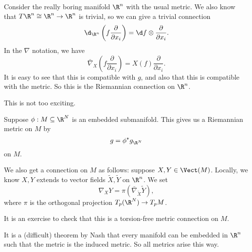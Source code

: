 \documentclass[a4paper]{article}
\begin{document}
\begin{eg}
  Consider the really boring manifold $\R^n$ with the usual metric. We also know that $T\R^n \cong \R^n \to \R^n$ is trivial, so we can give a trivial connection
  \[
    \d_{\R^n} \left(f \frac{\partial}{\partial x_i}\right) = \d f \otimes \frac{\partial}{\partial x_i}.
  \]
  In the $\nabla$ notation, we have
  \[
    \bar\nabla_X \left(f \frac{\partial}{\partial x_i}\right) = X(f) \frac{\partial}{\partial x_i}.
  \]
  It is easy to see that this is compatible with $g$, and also that this is compatible with the metric. So this is the Riemannian connection on $\R^n$.
\end{eg}

This is not too exciting.
\begin{eg}
  Suppose $\phi: M \subseteq \R^N$ is an embedded submanifold. This gives us a Riemannian metric on $M$ by
  \[
    g = \phi^* g_{\R^N}
  \]
  on $M$.

  We also get a connection on $M$ as follows: suppose $X, Y \in \Vect(M)$. Locally, we know $X, Y$ extends to vector fields $\tilde{X}, \tilde{Y}$ on $\R^n$. We set
  \[
    \nabla_X Y = \pi (\bar\nabla_{\tilde{X}} \tilde{Y}),
  \]
  where $\pi$ is the orthogonal projection $T_p(\R^N) \to T_pM$.

  It is an exercise to check that this is a torsion-free metric connection on $M$.
\end{eg}

It is a (difficult) theorem by Nash that every manifold can be embedded in $\R^n$ such that the metric is the induced metric. So all metrics arise this way.

\printindex
\end{document}
